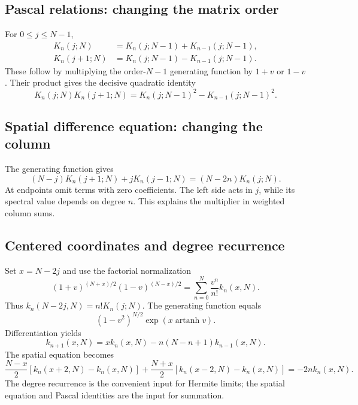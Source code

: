 \documentclass[11pt,reqno]{amsart}
\theoremstyle{remark}\newtheorem{remark}[theorem]{Remark}
\begin{document}
\subsection{Pascal relations: changing the matrix order}
For $0\le j\le N-1$,
\begin{align}
K_n(j;N)&=K_n(j;N-1)+K_{n-1}(j;N-1),\label{pascalplus}\\
K_n(j+1;N)&=K_n(j;N-1)-K_{n-1}(j;N-1).\label{pascalminus}
\end{align}
These follow by multiplying the order-$N-1$ generating function by $1+v$ or $1-v$. Their product gives the decisive quadratic identity
\begin{equation}\label{product}
K_n(j;N)K_n(j+1;N)=K_n(j;N-1)^2-K_{n-1}(j;N-1)^2.
\end{equation}

\subsection{Spatial difference equation: changing the column}
The generating function gives
\begin{equation}\label{spatial}
(N-j)K_n(j+1;N)+jK_n(j-1;N)=(N-2n)K_n(j;N).
\end{equation}
At endpoints omit terms with zero coefficients. The left side acts in $j$, while its spectral value depends on degree $n$. This explains the multiplier in weighted column sums.

\subsection{Centered coordinates and degree recurrence}
Set $x=N-2j$ and use the factorial normalization
\[
(1+v)^{(N+x)/2}(1-v)^{(N-x)/2}
=\sum_{n=0}^N\frac{v^n}{n!}k_n(x,N).
\]
Thus $k_n(N-2j,N)=n!K_n(j;N)$. The generating function equals
\begin{equation}\label{centeredlog}
(1-v^2)^{N/2}\exp(x\operatorname{artanh}v).
\end{equation}
Differentiation yields
\begin{equation}\label{degree}
k_{n+1}(x,N)=xk_n(x,N)-n(N-n+1)k_{n-1}(x,N).
\end{equation}
The spatial equation becomes
\begin{equation}\label{xspatial}
\frac{N-x}{2}[k_n(x+2,N)-k_n(x,N)]
+\frac{N+x}{2}[k_n(x-2,N)-k_n(x,N)]
=-2n k_n(x,N).
\end{equation}
The degree recurrence is the convenient input for Hermite limits; the spatial equation and Pascal identities are the input for summation.
\end{document}
